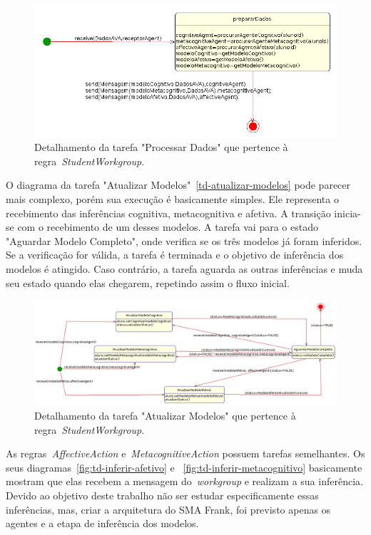 \begin{figure}
	\centering
	\includegraphics[scale=0.48]{images/td-processar-dados.png}
	\caption{Detalhamento da tarefa "Processar Dados" que pertence à regra~\emph{StudentWorkgroup}.}
	\label{fig:td-processar-dados}
\end{figure}

O diagrama da tarefa "Atualizar Modelos"~\ref{td-atualizar-modelos} pode parecer mais complexo, porém sua execução é basicamente simples. Ele representa o recebimento das inferências cognitiva, metacognitiva e afetiva. A transição inicia-se com o recebimento de um desses modelos. A tarefa vai para o estado "Aguardar Modelo Completo", onde verifica se os três modelos já foram inferidos. Se a verificação for válida, a tarefa é terminada e o objetivo de inferência dos modelos é atingido. Caso contrário, a tarefa aguarda as outras inferências e muda seu estado quando elas chegarem, repetindo assim o fluxo inicial.

\begin{figure}
	\centering
	\includegraphics[scale=0.4]{images/td-atualizar-modelos.png}
	\caption{Detalhamento da tarefa "Atualizar Modelos" que pertence à regra~\emph{StudentWorkgroup}.}
	\label{fig:td-atualizar-modelos}
\end{figure}

As regras~\emph{AffectiveAction} e~\emph{MetacognitiveAction} possuem tarefas semelhantes. Os seus diagramas~\ref{fig:td-inferir-afetivo} e ~\ref{fig:td-inferir-metacognitivo} basicamente mostram que elas recebem a mensagem do~\emph{workgroup} e realizam a sua inferência. Devido ao objetivo deste trabalho não ser estudar especificamente essas inferências, mas, criar a arquitetura do SMA Frank, foi previsto apenas os agentes e a etapa de inferência dos modelos.

